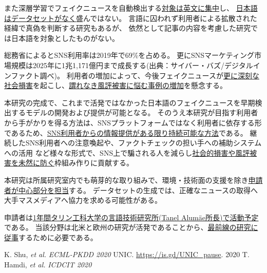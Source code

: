 また深層学習でフェイクニュースを自動検出する\underline{対象は英文に集中}し、
\underline{日本語はデータセットがなく}盛んではない。
言語に囚われず利用者による拡散された経緯で真偽を判断する研究もあるが\cite{tarek2020}、
依然として記事の内容を考慮した研究では日本語を対象としたものがない。

総務省によるとSNS利用率は2019年で69\%を占める。
更にSNSマーケティング市場規模は2025年に1兆1,171億円まで成長する(出典：サイバー・バズ/デジタルインファクト調べ)。
利用者の増加によって、今後フェイクニュースが\underline{更に深刻な社会損害}を起こし、\underline{謂れなき風評被害に悩む事例の増加}を懸念する。

本研究の完成で、これまで活発ではなかった日本語のフェイクニュースを早期検出するモデルの開発および提供が可能となる。
そのうえ本研究が目指す利用者から手がかりを得る方法は、SNSプラットフォームではなく利用者に依存する形であるため、\underline{SNS利用者からの情報提供がある限り持続可能な方法}である。
継続したSNS利用者への注意喚起や、ファクトチェックの担い手への補助システムへの活用
など様々な形式で、SNS上で騙される人を減らし\underline{社会的損害や風評被害を未然に防ぐ}枠組み作りに貢献する。



本研究は所属研究室内でも萌芽的な取り組みで、環境・技術面の支援を除き\underline{申請者が中心部分を担当}する。
データセットの生成では、正確なニュースの取得へ大手マスメディアへ協力を求める可能性がある。

申請者は\underline{1年間タリン工科大学の言語技術研究所(Tanel Alumäe所長)で活動予定}である。
当該分野は北米と欧州の研究が活発であることから、\underline{最前線の研究に従事}するために必要である。

\vspace{5mm}
{\footnotesize 
\begin{twobibliography}{99}
    \setlength{\parskip}{0cm}
    \setlength{\itemsep}{0cm}
    \setcounter{enumiv}{9}
     K. Shu, \textit{et al.} \textit{ECML-PKDD 2020}
     UNIC. \url{https://is.gd/UNIC_pause}. 2020
     T. Hamdi, \textit{et al.} \textit{ICDCIT 2020}
\end{twobibliography}
}


